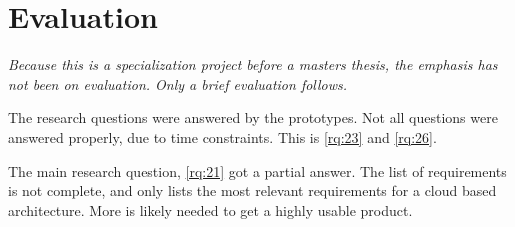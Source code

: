 \chapter{Evaluation}


\emph{Because this is a specialization project before a masters thesis, the emphasis has not been on evaluation. Only a brief evaluation follows.}

The research questions were answered by the prototypes.
Not all questions were answered properly, due to time constraints.
This is \cref{rq:23} and \cref{rq:26}.

The main research question, \cref{rq:21} got a partial answer.
The list of requirements is not complete, and only lists the most relevant requirements for a \gls{cloud} based architecture.
More is likely needed to get a highly usable product.
